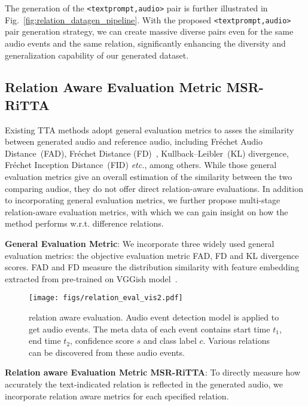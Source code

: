 The generation of the \texttt{<textprompt,audio>} pair is further illustrated in Fig.~\ref{fig:relation_datagen_pipeline}. With the proposed \texttt{<textprompt,audio>} pair generation strategy, we can create massive diverse pairs even for the same audio events and the same relation, significantly enhancing the diversity and generalization capability of our generated dataset.

\subsection{Relation Aware Evaluation Metric MSR-RiTTA}
\label{sec:relation_eval}

Existing TTA methods adopt general evaluation metrics to asses the similarity between generated audio and reference audio, including Fr\'{e}chet Audio Distance~(FAD), Fr\'{e}chet Distance (FD)~\citep{fid_distance}, Kullback–Leibler~(KL) divergence, Fr\'{e}chet Inception Distance~(FID) \textit{etc.}, among others. While those general evaluation metrics give an overall estimation of the similarity between the two comparing audios, they do not offer direct relation-aware evaluations. In addition to incorporating general evaluation metrics, we further propose multi-stage relation-aware evaluation metrics, with which we can gain insight on how the method performs w.r.t. difference relations.

\textbf{General Evaluation Metric}: We incorporate three widely used general evaluation metrics: the objective evaluation metric FAD, FD and KL divergence scores. 
FAD and FD measure the distribution similarity with feature embedding extracted from pre-trained on VGGish model~\citep{vggish}.

\begin{wrapfigure}{r}{0.35\textwidth}
    \centering
    \texttt{[image: figs/relation\_eval\_vis2.pdf]}
    \vspace{-2mm}
    \caption{\small relation aware evaluation. Audio event detection model is applied to get audio events. The meta data of each event contains start time $t_1$, end time $t_2$, confidence score $s$ and class label $c$. Various relations can be discovered from these audio events.}
    \label{fig:relation_eval_vis}
    \vspace{-3mm}
\end{wrapfigure}

\textbf{Relation aware Evaluation Metric MSR-RiTTA}: To directly measure how accurately the text-indicated relation is reflected in the generated audio, we incorporate relation aware metrics for each specified relation.

